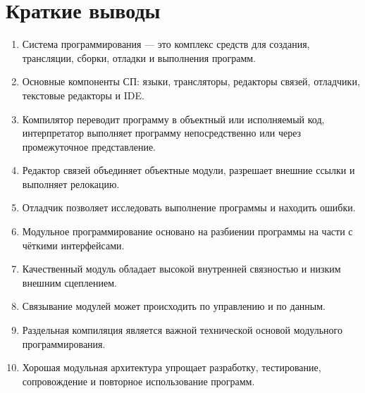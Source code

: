 \documentclass[12pt,a4paper]{article}
\begin{document}
\section{Краткие выводы}

\begin{enumerate}
  \item Система программирования --- это комплекс средств для создания, трансляции, сборки, отладки и выполнения программ.
  \item Основные компоненты СП: языки, трансляторы, редакторы связей, отладчики, текстовые редакторы и IDE.
  \item Компилятор переводит программу в объектный или исполняемый код, интерпретатор выполняет программу непосредственно или через промежуточное представление.
  \item Редактор связей объединяет объектные модули, разрешает внешние ссылки и выполняет релокацию.
  \item Отладчик позволяет исследовать выполнение программы и находить ошибки.
  \item Модульное программирование основано на разбиении программы на части с чёткими интерфейсами.
  \item Качественный модуль обладает высокой внутренней связностью и низким внешним сцеплением.
  \item Связывание модулей может происходить по управлению и по данным.
  \item Раздельная компиляция является важной технической основой модульного программирования.
  \item Хорошая модульная архитектура упрощает разработку, тестирование, сопровождение и повторное использование программ.
\end{enumerate}
\end{document}
